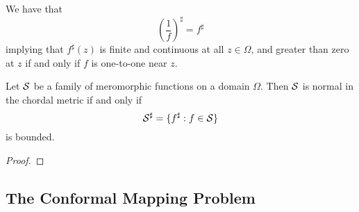 \documentclass{article}
\begin{document}
We have that
\begin{equation}\left(\frac{1}{f}\right)^\sharp = f^\sharp\end{equation}
implying that \(f^\sharp(z)\) is finite and continuous at all \(z \in \Omega\), and greater than zero at \(z\) if and only if \(f\) is one-to-one near \(z\).
\begin{theorem}
Let \(\mathcal{S}\) be a family of meromorphic functions on a domain \(\Omega\). Then \(\mathcal{S}\) is normal in the chordal metric if and only if
\begin{equation}\mathcal{S}^\sharp = \{f^\sharp : f \in \mathcal{S}\}\end{equation}
is bounded.
\end{theorem}
\begin{proof}
\end{proof}

\subsection{The Conformal Mapping Problem}
\end{document}
